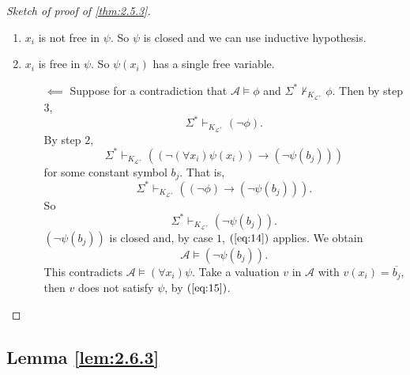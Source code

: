 \documentclass{article}
\newcommand{\A}{\mathcal{A}}
\renewcommand{\L}{\mathcal{L}}
\newcommand{\rb}[1]{\left( #1 \right)}
\newcommand{\notb}[1]{\rb{\neg #1}}
\newcommand{\impb}[2]{\rb{#1 \rightarrow #2}}
\newcommand{\fab}[1]{\rb{\forall #1}}
\theoremstyle{definition}\newtheorem{definition}{Definition}[subsection]
\theoremstyle{definition}\newtheorem{remark1}[definition]{Remark}
\theoremstyle{definition}\newtheorem{example1}[definition]{Example}
\theoremstyle{definition}\newtheorem*{remark2}{Remark}
\theoremstyle{definition}\newtheorem*{example2}{Example}
\theoremstyle{definition}\newtheorem*{note}{Note}
\theoremstyle{definition}\newtheorem*{notation}{Notation}
\begin{document}
\begin{proof}[Sketch of proof of \ref{thm:2.5.3}]
\begin{enumerate}[leftmargin=0.5in, label=Step \arabic*.]
\begin{itemize}
\begin{enumerate}[leftmargin=0.5in, label=Case \arabic*.]
\begin{enumerate}[leftmargin=0.5in, label=Case 3\alph*.]
\item $ x_i $ is not free in $ \psi $. So $ \psi $ is closed and we can use inductive hypothesis.
\item $ x_i $ is free in $ \psi $. So $ \psi\rb{x_i} $ has a single free variable.
\begin{itemize}
\item[$ \impliedby $] Suppose for a contradiction that $ \A \vDash \phi $ and $ \Sigma^* \not\vdash_{K_{\L^+}} \phi $. Then by step $ 3 $,
$$ \Sigma^* \vdash_{K_{\L^+}} \notb{\phi}. $$
By step $ 2 $,
$$ \Sigma^* \vdash_{K_{\L^+}} \impb{\notb{\fab{x_i}\psi\rb{x_i}}}{\notb{\psi\rb{b_j}}} $$
for some constant symbol $ b_j $. That is,
$$ \Sigma^* \vdash_{K_{\L^+}} \impb{\notb{\phi}}{\notb{\psi\rb{b_j}}}. $$
So
$$ \Sigma^* \vdash_{K_{\L^+}} \notb{\psi\rb{b_j}}. $$
$ \notb{\psi\rb{b_j}} $ is closed and, by case $ 1 $, $ \rb{\ref{eq:14}} $ applies. We obtain
\begin{equation}
\label{eq:15}
\A \vDash \notb{\psi\rb{b_j}}.
\end{equation}
This contradicts $ \A \vDash \fab{x_i}\psi $. Take a valuation $ v $ in $ \A $ with $ v\rb{x_i} = \overline{b_j} $, then $ v $ does not satisfy $ \psi $, by $ \rb{\ref{eq:15}} $.
\end{itemize}
\end{enumerate}
\end{enumerate}
\end{itemize}
\end{enumerate}
\end{proof}

\pagebreak

\subsection{Lemma \ref{lem:2.6.3}}
\end{document}
